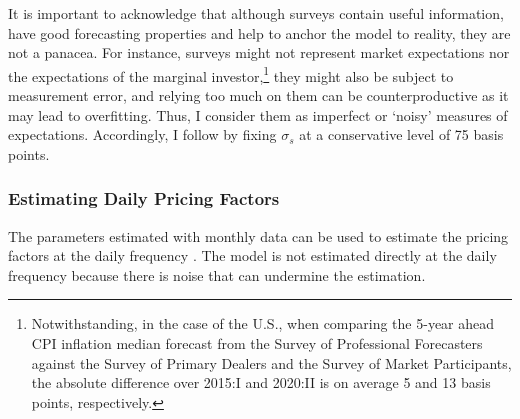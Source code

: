 {It is important to acknowledge that although surveys contain useful information, have good forecasting properties and help to anchor the model to reality, %
they are not a panacea. 
For instance, surveys might not represent market expectations nor the expectations of the marginal investor,\footnote{ Notwithstanding, in the case of the U.S., when comparing the 5-year ahead CPI inflation median forecast from the Survey of Professional Forecasters against the Survey of Primary Dealers and the Survey of Market Participants, the absolute difference over 2015:I and 2020:II is on average 5 and 13 basis points, respectively.} they might also be subject to measurement error, %
and relying too much on them can be counterproductive as it may lead to overfitting.
Thus, I consider them as imperfect or `noisy' measures of expectations. 
Accordingly, I follow \cite{KimOrphanides:2012} by
fixing \(\sigma_s\) at a conservative level of 75 basis points. 





\subsubsection{Estimating Daily Pricing Factors}
\iftoggle{toclinks}{\gototoc}{} %
The parameters estimated with monthly data can be used to estimate the pricing factors at the daily frequency \citep{ACM:2013}. The model is not estimated directly at the daily frequency because there is noise that can undermine the estimation. 

}
